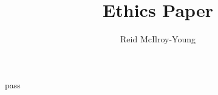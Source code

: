 \documentclass[12pt,a4paper]{article}
\author{Reid McIlroy-Young}
\title{Ethics Paper}
\begin{document}
\maketitle
pass
\end{document}

